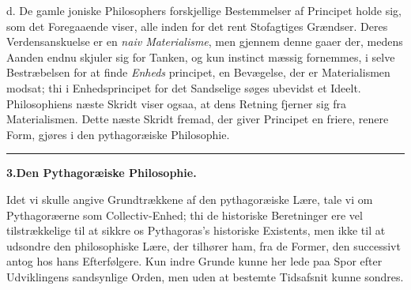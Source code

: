\documentclass[12pt,a4paper]{book}
\newcommand{\divrule}{\begin{center}\rule{2cm}{0.4pt}\end{center}}
\begin{document}
d. De gamle joniske Philosophers forskjellige Bestemmelser
af Principet holde sig, som det Foregaaende viser, alle inden\-%
for det rent Stofagtiges Grændser. Deres Verdensanskuelse er
en \emph{naiv Materialisme}, men gjennem denne gaaer der,
medens Aanden endnu skjuler sig for Tanken, og kun instinct\-%
mæssig fornemmes, i selve Bestræbelsen for at finde \emph{Enheds}\-%
principet, en Bevægelse, der er Materialismen modsat; thi i
Enhedsprincipet for det Sandselige søges ubevidst et Ideelt.
Philosophiens næste Skridt viser ogsaa, at dens Retning fjerner
sig fra Materialismen. Dette næste Skridt fremad, der giver
Principet en friere, renere Form, gjøres i den pythagoræiske
Philosophie.
\divrule
\begin{center}
\textbf{3.\enspace Den Pythagoræiske Philosophie.}
\end{center}
Idet vi skulle angive Grundtrækkene af den pythagoræiske
Lære, tale vi om Pythagoræerne som Collectiv-Enhed; thi de
historiske Beretninger ere vel tilstrækkelige til at sikkre os
Pythagoras's historiske Existents, men ikke til at udsondre
den philosophiske Lære, der tilhører ham, fra de Former, den
successivt antog hos hans Efterfølgere. Kun indre Grunde
kunne her lede paa Spor efter Udviklingens sandsynlige Orden,
men uden at bestemte Tidsafsnit kunne sondres.
\end{document}
